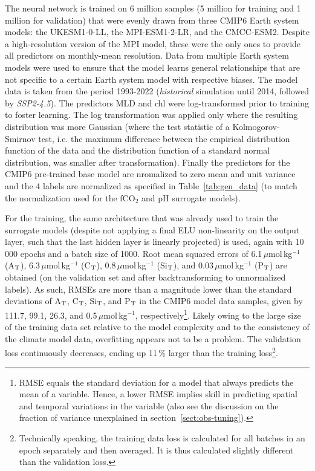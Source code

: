 \documentclass{article}
\begin{document}
	The neural network is trained on 6 million samples (5 million for training and 1 million for validation) that were evenly drawn from three CMIP6 Earth system models: the UKESM1-0-LL, the MPI-ESM1-2-LR, and the CMCC-ESM2. Despite a high-resolution version of the MPI model, these were the only ones to provide all predictors on monthly-mean resolution. Data from multiple Earth system models were used to ensure that the model learns general relationships that are not specific to a certain Earth system model with respective biases. The model data is taken from the period 1993-2022 (\textit{historical} simulation until 2014, followed by \textit{SSP2-4.5}). The predictors MLD and chl were log-transformed prior to training to foster learning. The log transformation was applied only where the resulting distribution was more Gaussian (where the test statistic of a Kolmogorov-Smirnov test, i.e. the maximum difference between the empirical distribution function of the data and the distribution function of a standard normal distribution, was smaller after transformation). 
	Finally the predictors for the CMIP6 pre-trained base model are nromalized to zero mean and unit variance and the 4 labels are normalized as specified in Table~\ref{tab:gen_data} (to match the normalization used for the fCO$_2$ and pH surrogate models).
	
	For the training, the same architecture that was already used to train the surrogate models (despite not applying a final ELU non-linearity on the output layer, such that the last hidden layer is linearly projected) is used, again with 10\,000 epochs and a batch size of 1000. Root mean squared errors of 6.1\,$\mu$mol\,kg$^{-1}$ (A$_\textup{T}$), 6.3\,$\mu$mol\,kg$^{-1}$ (C$_\textup{T}$), 0.8\,$\mu$mol\,kg$^{-1}$ (Si$_\textup{T}$), and 0.03\,$\mu$mol\,kg$^{-1}$ (P$_\textup{T}$) are obtained (on the validation set and after backtransforming to unnormalized labels). As such, RMSEs are more than a magnitude lower than the standard deviations of A$_\textup{T}$, C$_\textup{T}$, Si$_\textup{T}$, and P$_\textup{T}$ in the CMIP6 model data samples, given by 111.7, 99.1, 26.3, and 0.5\,$\mu$mol\,kg$^{-1}$, respectively\footnote{RMSE equals the standard deviation for a model that always predicts the mean of a variable. Hence, a lower RMSE implies skill in predicting spatial and temporal variations in the variable (also see the discussion on the fraction of variance unexplained in section~\ref{sect:obs-tuning}).}. Likely owing to the large size of the training data set relative to the model complexity and  to the consistency of the climate model data, overfitting appears not to be a problem. The validation loss continuously decreases, ending up 11\,\% larger than the training loss\footnote{Technically speaking, the training data loss is calculated for all batches in an epoch separately and then averaged. It is thus calculated slightly different than the validation loss.}.
	
\end{document}
